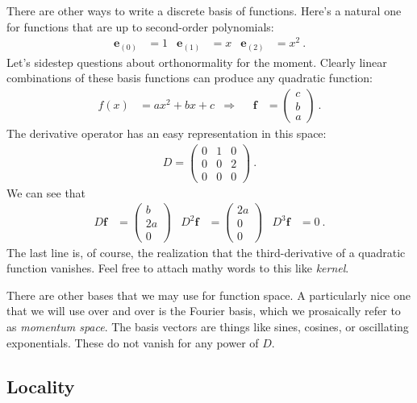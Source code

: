 \documentclass[12pt]{article}
\numberwithin{equation}{section}    %
\renewcommand{\vec}[1]{\mathbf{#1}} %
\begin{document}
There are other ways to write a discrete basis of functions. Here’s a natural one for functions that are up to second-order polynomials:
\begin{align}
  \vec{e}_{(0)} &= 1
  &
  \vec{e}_{(1)} &= x
  &
  \vec{e}_{(2)} &= x^2 \ .
\end{align}
Let’s sidestep questions about orthonormality for the moment. Clearly linear combinations of these basis functions can produce any quadratic function:
\begin{align}
  f(x) &= a x^2 + bx + c
  & \Rightarrow&&
  \vec{f} &=
  \begin{pmatrix}
     c \\ b \\ a
   \end{pmatrix} \ . 
\end{align}
The derivative operator has an easy representation in this space:
\begin{align}
  D = 
  \begin{pmatrix}
    0 & 1 & 0   \\
    0 & 0 & 2   \\
    0 & 0 & 0   
  \end{pmatrix} \ .
\end{align}
We can see that
\begin{align}
  D \vec{f}  &= 
  \begin{pmatrix}
     b \\
     2 a \\
     0
  \end{pmatrix} 
  &
  D^2 \vec{f}  &= 
  \begin{pmatrix}
     2a \\
     0 \\
     0
  \end{pmatrix} 
  &
  D^3 \vec{f}  &= 
  0 \ .
\end{align}
The last line is, of course, the realization that the third-derivative of a quadratic function vanishes. Feel free to attach mathy words to this like \emph{kernel}.

There are other bases that we may use for function space. A particularly nice one that we will use over and over is the Fourier basis, which we prosaically refer to as \emph{momentum space}. The basis vectors are things like sines, cosines, or oscillating exponentials. These do not vanish for any power of $D$.


\subsection{Locality}
\end{document}
